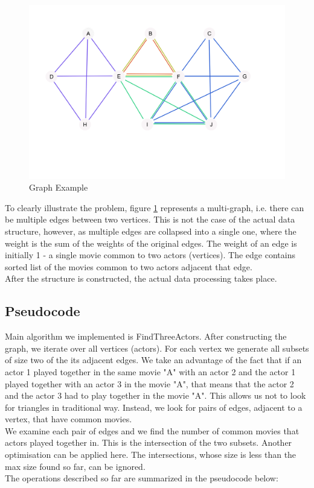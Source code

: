 \begin{figure}[ht!]
\centering
\includegraphics[width=130mm]{resources/project_problem_illustration.png}
\caption{Graph Example}
\label{example}
\end{figure}

To clearly illustrate the problem, figure \ref{example} represents a multi-graph, i.e. there can be multiple edges between two vertices. This is not the case of the actual data structure, however, as multiple edges are collapsed into a single one, where the weight is the sum of the weights of the original edges. The weight of an edge is initially 1 - a single movie common to two actors (vertices). The edge contains sorted list of the movies common to two actors adjacent that edge.
\\
After the structure is constructed, the actual data processing takes place.


\subsection{Pseudocode}
Main algorithm we implemented is FindThreeActors. After constructing the graph, we iterate over all vertices (actors). For each vertex we generate all subsets of size two of the its adjacent edges. We take an advantage of the fact that if an actor 1 played together in the same movie "A" with an actor 2 and the actor 1 played together with an actor 3 in the movie "A", that means that the actor 2 and the actor 3 had to play together in the movie "A". This allows us not to look for triangles in traditional way. Instead, we look for pairs of edges, adjacent to a vertex, that have common movies.
\\
We examine each pair of edges and we find the number of common movies that actors played together in. This is the intersection of the two subsets. Another optimisation can be applied here. The intersections, whose size is less than the max size found so far, can be ignored.
\\
The operations described so far are summarized in the pseudocode below:

